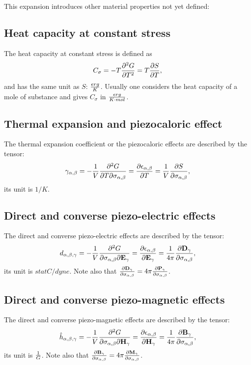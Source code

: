 \documentclass[12pt,a4paper]{article}
\begin{document}
{This expansion introduces other material properties not yet defined:
\subsection{\color{orange}Heat capacity at constant stress}
The heat capacity at constant stress is defined as
\begin{equation}
C_\sigma= - T {\partial^2 G \over \partial T^2} = 
T {\partial S \over \partial T},
\end{equation}
and has the same unit as $S$: $erg\over K$. Usually one considers the heat
capacity of a mole of substance and gives $C_\sigma$ in 
${erg \over K \cdot mol}$.

\subsection{\color{orange}Thermal expansion and piezocaloric effect}
The thermal expansion coefficient or the piezocaloric effects are
described by the tensor:
\begin{equation}
\gamma_{\alpha,\beta}=-{1\over V} {\partial^2 G \over \partial T 
\partial \sigma_{\alpha,\beta}}={\partial \epsilon_{\alpha,\beta} \over 
\partial T}= {1\over V}
{\partial S \over \partial \sigma_{\alpha,\beta}},
\end{equation}
its unit is $1/K$.

\subsection{\color{orange}Direct and converse piezo-electric effects}
The direct and converse piezo-electric effects are described by the 
tensor:
\begin{equation}
d_{\alpha,\beta,\gamma}=-{1\over V} {\partial^2 G \over
\partial \sigma_{\alpha,\beta} \partial {\bf E}_\gamma}=
{\partial \epsilon_{\alpha,\beta} \over \partial {\bf E}_\gamma}= 
{1\over 4\pi}{\partial {\bf D}_\gamma \over \partial \sigma_{\alpha,\beta}},
\end{equation}
its unit is $statC/dyne$. Note also that 
${\partial {\bf D}_\gamma \over \partial \sigma_{\alpha,\beta}}
=4\pi {\partial {\bf P}_\gamma \over \partial \sigma_{\alpha,\beta}}$.

\subsection{\color{orange}Direct and converse piezo-magnetic effects}
The direct and converse piezo-magnetic effects are described by the 
tensor:
\begin{equation}
\hat h_{\alpha,\beta,\gamma}=-{1\over V} {\partial^2 G \over
\partial \sigma_{\alpha,\beta} \partial {\bf H}_\gamma}= 
{\partial \epsilon_{\alpha,\beta} \over \partial {\bf H}_\gamma}= 
{1 \over 4 \pi}{\partial {\bf B}_\gamma \over \partial \sigma_{\alpha,\beta}},
\end{equation}
its unit is ${1\over G}$. Note also that 
${\partial {\bf B}_\gamma \over \partial \sigma_{\alpha,\beta}}
=4 \pi {\partial {\bf M}_\gamma \over \partial \sigma_{\alpha,\beta}}$.

}
\end{document}
